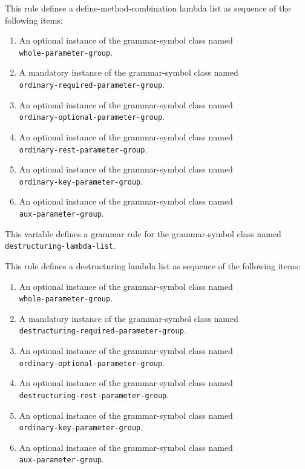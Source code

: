 This rule defines a define-method-combination lambda list as sequence
of the following items:

\begin{enumerate}
\item An optional instance of the grammar-symbol class named\\
  \texttt{whole-parameter-group}.
\item A mandatory instance of the grammar-symbol class named\\
  \texttt{ordinary-required-parameter-group}.
\item An optional instance of the grammar-symbol class named\\
  \texttt{ordinary-optional-parameter-group}.
\item An optional instance of the grammar-symbol class named\\
\texttt{ordinary-rest-parameter-group}.
\item An optional instance of the grammar-symbol class named\\
\texttt{ordinary-key-parameter-group}.
\item An optional instance of the grammar-symbol class named\\
\texttt{aux-parameter-group}.
\end{enumerate}


This variable defines a grammar rule for the grammar-symbol class
named \texttt{destructuring-lambda-list}.

This rule defines a destructuring lambda list as sequence of the
following items:

\begin{enumerate}
\item An optional instance of the grammar-symbol class named\\
  \texttt{whole-parameter-group}.
\item A mandatory instance of the grammar-symbol class named\\
  \texttt{destructuring-required-parameter-group}.
\item An optional instance of the grammar-symbol class named\\
  \texttt{ordinary-optional-parameter-group}.
\item An optional instance of the grammar-symbol class named\\
\texttt{destructuring-rest-parameter-group}.
\item An optional instance of the grammar-symbol class named\\
\texttt{ordinary-key-parameter-group}.
\item An optional instance of the grammar-symbol class named\\
\texttt{aux-parameter-group}.
\end{enumerate}

